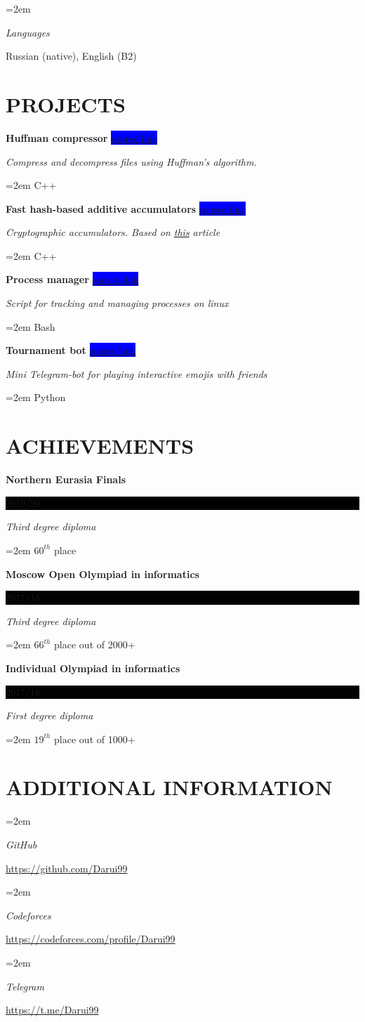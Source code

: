 \documentclass[paper=a4,fontsize=11pt]{scrartcl} %
\newlength{\spacebox}
\newcommand{\sepspace}{\vspace*{1em}}		%
\newcommand{\NewPart}[1]{\section*{\uppercase{#1}}}
\newcommand{\PersonalEntry}[2]{
		\noindent\hangindent=2em\hangafter=0 %
		\parbox{\spacebox}{        %
		\textit{#1}}		       %
		\hspace{1.5em} #2 \par}    %
\newcommand{\SkillsEntry}[2]{      %
		\noindent\hangindent=2em\hangafter=0 %
		\parbox{\spacebox}{        %
		\textit{#1}}			   %
		\hspace{1.5em} #2 \par}    %
\newcommand{\EducationEntry}[4]{
		\noindent \textbf{#1} \hfill      %
		\colorbox{Black}{%
			\parbox{6em}{%
			\hfill\color{White}#2}} \par  %
		\noindent \textit{#3} \par        %
		\noindent\hangindent=2em\hangafter=0 \small #4 %
		\normalsize \par}
\newcommand{\WorkEntry}[4]{				  %
		\noindent \textbf{#1} \hfill      %
		\colorbox{Blue}{\color{White}#2} \par  %
		\noindent \textit{#3} \par              %
		\noindent\hangindent=2em\hangafter=0 \small #4 %
		\normalsize \par}
\begin{document}
\SkillsEntry{Languages}{Russian (native), English (B2)}
\sepspace

\NewPart{Projects}{}

\WorkEntry{Huffman compressor}{\href{https://github.com/Darui99/ITMO-CPP/tree/master/Huffman}{source link}}{Compress and decompress files using Huffman's algorithm.}{C++}
\sepspace

\WorkEntry{Fast hash-based additive accumulators}{\href{https://github.com/IvanMaslov/AdditiveAccumulator}{source link}}{Cryptographic accumulators. Based on \href{https://github.com/bigspider/accumulator/blob/master/docs/paper-draft.pdf}{this} article}{C++}
\sepspace

\WorkEntry{Process manager}{\href{https://github.com/Darui99/ITMO-OS/tree/master/HW4 (alternative)}{source link}}{Script for tracking and managing processes on linux}{Bash}
\sepspace

\WorkEntry{Tournament bot}{\href{https://github.com/Alexvsalexvsalex/telegram-game-bot}{source link}}{Mini Telegram-bot for playing interactive emojis with friends}{Python}
\sepspace

\NewPart{Achievements}{}

\EducationEntry{Northern Eurasia Finals}{2019/20}{Third degree diploma}{$60^{th}$ place}
\sepspace

\EducationEntry{Moscow Open Olympiad in informatics}{2017/18}{Third degree diploma}{$66^{th}$ place out of 2000+}
\sepspace

\EducationEntry{Individual Olympiad in informatics}{2017/18}{First degree diploma}{$19^{th}$ place out of 1000+}
\sepspace

\NewPart{Additional information}{}

\SkillsEntry{GitHub}{\href{https://github.com/Darui99}{https://github.com/Darui99} }
\sepspace

\SkillsEntry{Codeforces}{\href{https://codeforces.com/profile/Darui99}{https://codeforces.com/profile/Darui99} }
\sepspace

\SkillsEntry{Telegram}{\href{https://t.me/Darui99}{https://t.me/Darui99} }
\end{document}
